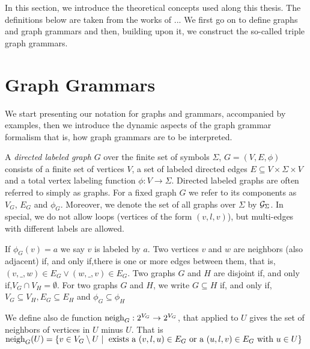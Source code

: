 
In this section, we introduce the theoretical concepts used along this thesis. The definitions below are taken from the works of ...%
We first go on to define graphs and graph grammars and then, building upon it, we construct the so-called triple graph grammars.

\section{Graph Grammars}
We start presenting our notation for graphs and grammars, accompanied by examples, then we introduce the dynamic aspects of the graph grammar formalism that is, how graph grammars are to be interpreted.


\begin{definition}
	\label{def:graph}
	A \emph{directed labeled graph} $G$ over the finite set of symbols $\Sigma$, $G = (V, E, \phi)$ consists of a finite set of vertices $V$, a set of labeled directed edges $E \subseteq V \times \Sigma \times V$ and a total vertex labeling function $\phi : V \to \Sigma$. Directed labeled graphs are often referred to simply as graphs. For a fixed graph $G$ we refer to its components as $V_G$, $E_G$ and $\phi_G$. Moreover, we denote the set of all graphs over $\Sigma$ by $\mathcal{G}_{\Sigma}$. In special, we do not allow loops (vertices of the form $(v,l,v)$), but multi-edges with different labels are allowed.
	
	If $\phi_G(v) = a$ we say $v$ is labeled by $a$. Two vertices $v$ and $w$ are neighbors (also adjacent) if, and only if,there is one or more edges between them, that is, $(v,\_,w) \in E_G \lor (w,\_,v) \in E_G$. Two graphs $G$ and $H$ are disjoint if, and only if,$V_G \cap V_H = \emptyset$. For two graphs $G$ and $H$, we write $G \subseteq H$ if, and only if, $V_G \subseteq V_H, E_G \subseteq E_H$ and $\phi_G \subseteq \phi_H$
	
	We define also de function $\operatorname{neigh}_{G}: 2^{V_G} \to 2^{V_G}$, that applied to $U$ gives the set of neighbors of vertices in $U$ minus $U$. That is $\operatorname{neigh}_{G}(U) = \{ v \in V_G \setminus U \; | \; \text{ exists a } (v,l,u) \in E_G \text{ or a } (u,l,v) \in E_G \text{ with } u \in U \}$
\end{definition}

